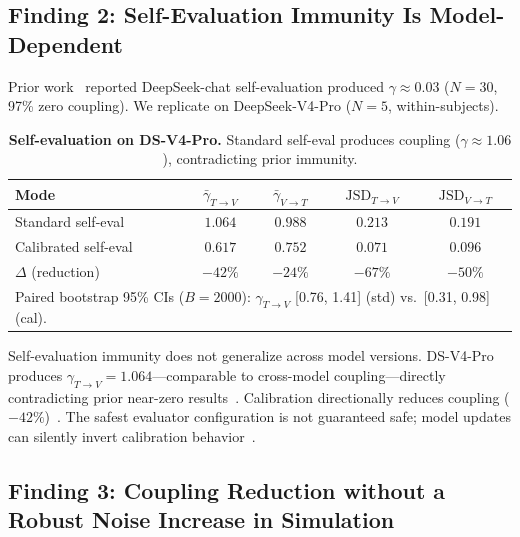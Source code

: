 \documentclass[11pt]{article}
\theoremstyle{definition}
\theoremstyle{remark}
\begin{document}
\subsection{Finding 2: Self-Evaluation Immunity Is Model-Dependent}

Prior work~\citep{epc2026} reported DeepSeek-chat self-evaluation produced $\gamma \approx 0.03$ ($N{=}30$, 97\% zero coupling). We replicate on DeepSeek-V4-Pro ($N{=}5$, within-subjects).

\begin{table}[H]
\centering
\caption{\textbf{Self-evaluation on DS-V4-Pro.} Standard self-eval produces coupling ($\gamma \approx 1.06$), contradicting prior immunity.}
\begin{tabular}{@{}lcccc@{}}
\toprule
Mode & $\bar{\gamma}_{T \to V}$ & $\bar{\gamma}_{V \to T}$ & $\text{JSD}_{T \to V}$ & $\text{JSD}_{V \to T}$ \\
\midrule
Standard self-eval & $1.064$ & $0.988$ & $0.213$ & $0.191$ \\
Calibrated self-eval & $\mathbf{0.617}$ & $\mathbf{0.752}$ & $\mathbf{0.071}$ & $\mathbf{0.096}$ \\
\midrule
$\Delta$ (reduction) & $-42\%$ & $-24\%$ & $-67\%$ & $-50\%$ \\
\bottomrule
\multicolumn{5}{l}{\footnotesize Paired bootstrap 95\% CIs ($B{=}2000$): $\gamma_{T\to V}$ [0.76, 1.41] (std) vs.\ [0.31, 0.98] (cal).} \\
\end{tabular}
\end{table}

Self-evaluation immunity does not generalize across model versions. DS-V4-Pro produces $\gamma_{T \to V} = 1.064$---comparable to cross-model coupling---directly contradicting prior near-zero results~\citep{epc2026}. Calibration directionally reduces coupling ($-42\%$)~\citep{tian2023just}. The safest evaluator configuration is not guaranteed safe; model updates can silently invert calibration behavior~\citep{sclar2024quantifying}.

\subsection{Finding 3: Coupling Reduction without a Robust Noise Increase in Simulation}
\end{document}
